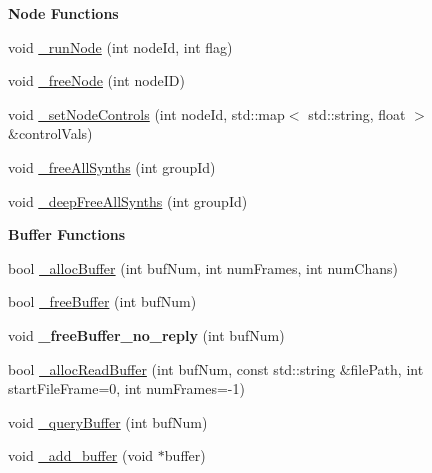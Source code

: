 \begin{Indent}{\bf Node Functions}
\begin{DoxyCompactItemize}
\item 
void \hyperlink{classColliderPlusPlus_1_1Client__Server_a6a7d155ca004a6a26409517a3f762aee}{\-\_\-run\-Node} (int node\-Id, int flag)
\item 
void \hyperlink{classColliderPlusPlus_1_1Client__Server_ad8d8e91efa40eb11edfdca802a82ec9a}{\-\_\-free\-Node} (int node\-I\-D)
\item 
void \hyperlink{classColliderPlusPlus_1_1Client__Server_a54cbee6b8ac056f77d0df2e77d79d260}{\-\_\-set\-Node\-Controls} (int node\-Id, std\-::map$<$ std\-::string, float $>$ \&control\-Vals)
\item 
void \hyperlink{classColliderPlusPlus_1_1Client__Server_a05ffd0269ebcebeabe211a5406782544}{\-\_\-free\-All\-Synths} (int group\-Id)
\item 
void \hyperlink{classColliderPlusPlus_1_1Client__Server_a12c0bde46f4660bf12a22e2262183c53}{\-\_\-deep\-Free\-All\-Synths} (int group\-Id)
\end{DoxyCompactItemize}
\end{Indent}
\begin{Indent}{\bf Buffer Functions}\par
\begin{DoxyCompactItemize}
\item 
bool \hyperlink{classColliderPlusPlus_1_1Client__Server_ad8a85d8a8f25f1f1b0133078dbd4c4d3}{\-\_\-alloc\-Buffer} (int buf\-Num, int num\-Frames, int num\-Chans)
\item 
bool \hyperlink{classColliderPlusPlus_1_1Client__Server_a5dd10ce383bba35133c7057dee000170}{\-\_\-free\-Buffer} (int buf\-Num)
\item 
\hypertarget{classColliderPlusPlus_1_1Client__Server_a96eeaddefced0fe608a6f50e70a8924d}{void {\bfseries \-\_\-free\-Buffer\-\_\-no\-\_\-reply} (int buf\-Num)}\label{classColliderPlusPlus_1_1Client__Server_a96eeaddefced0fe608a6f50e70a8924d}

\item 
bool \hyperlink{classColliderPlusPlus_1_1Client__Server_a293596d6659f4b6bfb5d46e2b310cfa2}{\-\_\-alloc\-Read\-Buffer} (int buf\-Num, const std\-::string \&file\-Path, int start\-File\-Frame=0, int num\-Frames=-\/1)
\item 
void \hyperlink{classColliderPlusPlus_1_1Client__Server_ad4f4ff49145681381f451ba91a6c07e2}{\-\_\-query\-Buffer} (int buf\-Num)
\item 
void \hyperlink{classColliderPlusPlus_1_1Client__Server_a0ed8cb6f780d472bbe8b41f2435d4020}{\-\_\-add\-\_\-buffer} (void $\ast$buffer)
\end{DoxyCompactItemize}
\end{Indent}


